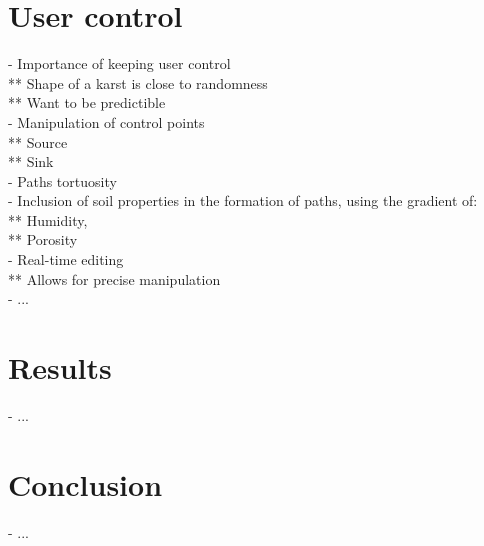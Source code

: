 \section{User control}
\label{sec:karsts_user-control}
- Importance of keeping user control \\
** Shape of a karst is close to randomness \\
** Want to be predictible \\
- Manipulation of control points \\
** Source \\
** Sink \\
- Paths tortuosity \\
- Inclusion of soil properties in the formation of paths, using the gradient of: \\
** Humidity, \\
** Porosity \\
- Real-time editing \\
** Allows for precise manipulation \\
- ...

\section{Results}
\label{sec:karsts_results}
- ... 

\section{Conclusion}
\label{sec:karsts_conclusion}
- ...